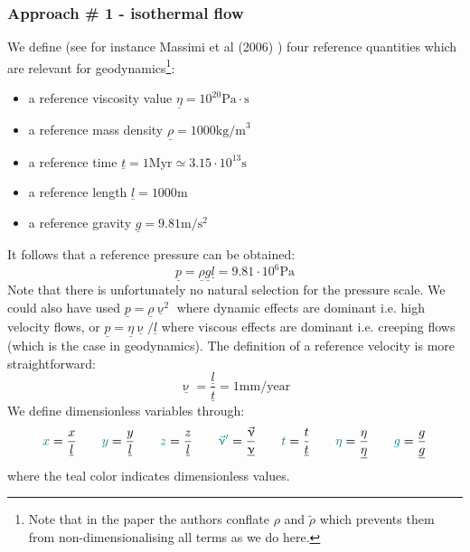 \subsubsection{Approach \# 1 - isothermal flow}

We define (see for instance Massimi et al (2006) \cite{maqs06}) four reference 
quantities which are relevant for geodynamics\footnote{Note that in the paper 
the authors conflate $\rho$ and $\tilde{\rho}$ which prevents them from non-dimensionalising
all terms as we do here.}:
\begin{itemize}
\item a reference viscosity value $\underline{\eta}=10^{20}\text{Pa}\cdot\text{s}$
\item a reference mass density $\underline{\rho}=1000\text{kg/m}^3$
\item a reference time $\underline{t}=1\text{Myr}\simeq 3.15\cdot 10^{13} \text{s}$
\item a reference length $\underline{l}=1000\text{m} $
\item a reference gravity $\underline{g}=9.81\text{m}/\text{s}^2$
\end{itemize}
It follows that a reference pressure can be obtained:
\[
\underline{p}=\underline{\rho} \underline{g} \underline{l} = 9.81\cdot 10^6\text{Pa}
\]
Note that there is unfortunately no natural selection for the pressure scale. 
We could also have used $\underline{p}=\underline{\rho}\underline{\upnu}^2$ 
where dynamic effects are dominant i.e. high velocity flows,
or $\underline{p}=\underline{\eta}\underline{\upnu}/\underline{l}$ 
where viscous effects are dominant i.e. creeping flows (which 
is the case in geodynamics).
The definition of a reference velocity is more straightforward:
\[
\underline{\upnu} = \frac{\underline{l}}{\underline{t}} = 1 \text{mm}/\text{year}
\]
We define dimensionless variables through:
\[
{\color{teal}x} = \frac{x}{\underline{l}}
\qquad
{\color{teal}y} = \frac{y}{\underline{l}}
\qquad
{\color{teal}z} = \frac{z}{\underline{l}}
\qquad
{\color{teal}\vec\upnu'} = \frac{\vec\upnu}{\underline{\upnu}}
\qquad
{\color{teal}t} = \frac{t}{\underline{t}}
\qquad
{\color{teal} \eta} = \frac{\eta}{\underline{\eta}}
\qquad
{\color{teal} g} =\frac{g}{\underline{g}}
\]
where the teal color indicates dimensionless values.

